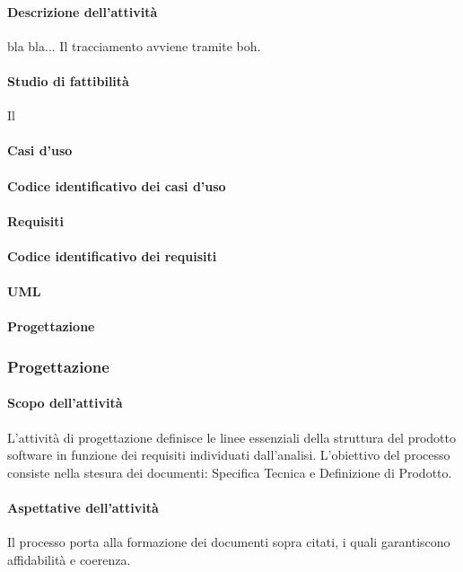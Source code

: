  \paragraph{Descrizione dell'attività}
 bla bla... \ARdocRR
 Il tracciamento avviene tramite boh.
 \paragraph{Studio di fattibilità}
 Il \RESP \SFdocRR
 \paragraph{Casi d'uso}

 \paragraph{Codice identificativo dei casi d'uso}

 \paragraph{Requisiti}

 \paragraph{Codice identificativo dei requisiti}

 \paragraph{UML}

 \paragraph{Progettazione}

\subsubsection{Progettazione}
 \paragraph{Scopo dell'attività}
L'attività di progettazione definisce le linee essenziali della struttura del prodotto software in
funzione dei requisiti individuati dall'analisi. L'obiettivo del processo consiste nella stesura dei
documenti: Specifica Tecnica e Definizione di Prodotto.
 \paragraph{Aspettative dell'attività}
Il processo porta alla formazione dei documenti sopra citati, i quali garantiscono affidabilità e
coerenza.
